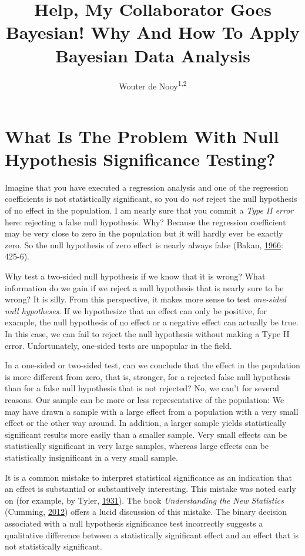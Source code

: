 \documentclass[
  english,
  doc]{apa6}
\title{Help, My Collaborator Goes Bayesian! Why And How To Apply Bayesian Data Analysis}
\author{Wouter de Nooy\textsuperscript{1,2}}
\date{}
\affiliation{\vspace{0.5cm}\textsuperscript{1} Amsterdam School of Communication Research ASCor}
\begin{document}
\maketitle

\hypertarget{what-is-the-problem-with-null-hypothesis-significance-testing}{%
\section{What Is The Problem With Null Hypothesis Significance Testing?}\label{what-is-the-problem-with-null-hypothesis-significance-testing}}

Imagine that you have executed a regression analysis and one of the regression coefficients is not statistically significant, so you do \emph{not} reject the null hypothesis of no effect in the population. I am nearly sure that you commit a \emph{Type II error} here: rejecting a false null hypothesis. Why? Because the regression coefficient may be very close to zero in the population but it will hardly ever be exactly zero. So the null hypothesis of zero effect is nearly always false (Bakan, \protect\hyperlink{ref-bakanTestSignificancePsychological1966}{1966}: 425-6).

Why test a two-sided null hypothesis if we know that it is wrong? What information do we gain if we reject a null hypothesis that is nearly sure to be wrong? It is silly. From this perspective, it makes more sense to test \emph{one-sided null hypotheses}. If we hypothesize that an effect can only be positive, for example, the null hypothesis of no effect or a negative effect can actually be true. In this case, we can fail to reject the null hypothesis without making a Type II error. Unfortunately, one-sided tests are unpopular in the field.

In a one-sided or two-sided test, can we conclude that the effect in the population is more different from zero, that is, stronger, for a rejected false null hypothesis than for a false null hypothesis that is not rejected? No, we can't for several reasons. Our sample can be more or less representative of the population: We may have drawn a sample with a large effect from a population with a very small effect or the other way around. In addition, a larger sample yields statistically significant results more easily than a smaller sample. Very small effects can be statistically significant in very large samples, whereas large effects can be statistically insignificant in a very small sample.

It is a common mistake to interpret statistical significance as an indication that an effect is substantial or substantively interesting. This mistake was noted early on (for example, by Tyler, \protect\hyperlink{ref-tylerWhatStatisticalSignificance1931}{1931}). The book \emph{Understanding the New Statistics} (Cumming, \protect\hyperlink{ref-CummingUnderstandingnewstatistics2012}{2012}) offers a lucid discussion of this mistake. The binary decision associated with a null hypothesis significance test incorrectly suggests a qualitative difference between a statistically significant effect and an effect that is not statistically significant.
\end{document}
